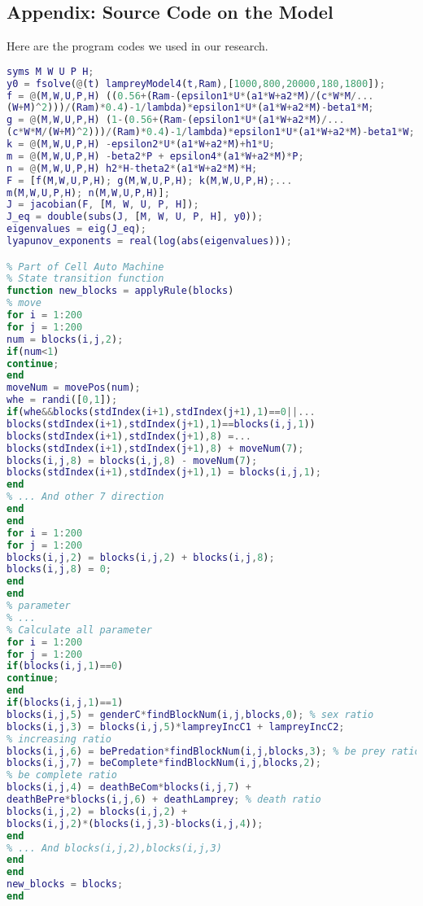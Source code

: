 \documentclass[12pt]{article}  %
\begin{document}
\begin{subappendices}  %

\section{Appendix: Source Code on the Model}
Here are the program codes we used in our research.
\begin{lstlisting}[language=MATLAB, name={test.m}]
% Lyapunov Exponents
syms M W U P H;
y0 = fsolve(@(t) lampreyModel4(t,Ram),[1000,800,20000,180,1800]);
f = @(M,W,U,P,H) ((0.56+(Ram-(epsilon1*U*(a1*W+a2*M)/(c*W*M/...
(W+M)^2)))/(Ram)*0.4)-1/lambda)*epsilon1*U*(a1*W+a2*M)-beta1*M;
g = @(M,W,U,P,H) (1-(0.56+(Ram-(epsilon1*U*(a1*W+a2*M)/...
(c*W*M/(W+M)^2)))/(Ram)*0.4)-1/lambda)*epsilon1*U*(a1*W+a2*M)-beta1*W;
k = @(M,W,U,P,H) -epsilon2*U*(a1*W+a2*M)+h1*U;
m = @(M,W,U,P,H) -beta2*P + epsilon4*(a1*W+a2*M)*P;
n = @(M,W,U,P,H) h2*H-theta2*(a1*W+a2*M)*H;
F = [f(M,W,U,P,H); g(M,W,U,P,H); k(M,W,U,P,H);...
m(M,W,U,P,H); n(M,W,U,P,H)];
J = jacobian(F, [M, W, U, P, H]);
J_eq = double(subs(J, [M, W, U, P, H], y0));
eigenvalues = eig(J_eq);
lyapunov_exponents = real(log(abs(eigenvalues)));

% Part of Cell Auto Machine
% State transition function
function new_blocks = applyRule(blocks)
% move
for i = 1:200
for j = 1:200
num = blocks(i,j,2);
if(num<1)
continue;
end
moveNum = movePos(num);
whe = randi([0,1]);
if(whe&&blocks(stdIndex(i+1),stdIndex(j+1),1)==0||...
blocks(stdIndex(i+1),stdIndex(j+1),1)==blocks(i,j,1))
blocks(stdIndex(i+1),stdIndex(j+1),8) =...
blocks(stdIndex(i+1),stdIndex(j+1),8) + moveNum(7);
blocks(i,j,8) = blocks(i,j,8) - moveNum(7);
blocks(stdIndex(i+1),stdIndex(j+1),1) = blocks(i,j,1);
end
% ... And other 7 direction
end
end
for i = 1:200
for j = 1:200
blocks(i,j,2) = blocks(i,j,2) + blocks(i,j,8);
blocks(i,j,8) = 0;
end
end
% parameter 
% ...
% Calculate all parameter
for i = 1:200
for j = 1:200
if(blocks(i,j,1)==0)
continue;
end
if(blocks(i,j,1)==1)
blocks(i,j,5) = genderC*findBlockNum(i,j,blocks,0); % sex ratio
blocks(i,j,3) = blocks(i,j,5)*lampreyIncC1 + lampreyIncC2; 
% increasing ratio
blocks(i,j,6) = bePredation*findBlockNum(i,j,blocks,3); % be prey ratio
blocks(i,j,7) = beComplete*findBlockNum(i,j,blocks,2); 
% be complete ratio
blocks(i,j,4) = deathBeCom*blocks(i,j,7) +
deathBePre*blocks(i,j,6) + deathLamprey; % death ratio
blocks(i,j,2) = blocks(i,j,2) +
blocks(i,j,2)*(blocks(i,j,3)-blocks(i,j,4));
end
% ... And blocks(i,j,2),blocks(i,j,3)
end
end
new_blocks = blocks;
end



\end{lstlisting}
\end{subappendices}
\end{document}
